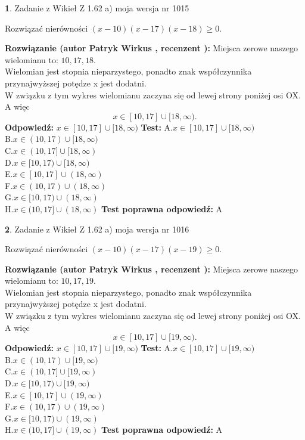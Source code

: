 \documentclass[12pt, a4paper]{article}
\theoremstyle{definition} %
\newtheorem{zad}{}
\newcommand{\zadStart}[1]{\begin{zad}#1\newline}
\newcommand{\zadStop}{\end{zad}}
\newcommand{\rozwStart}[2]{\noindent \textbf{Rozwiązanie (autor #1 , recenzent #2): }\newline}
\newcommand{\rozwStop}{\newline}
\newcommand{\odpStart}{\noindent \textbf{Odpowiedź:}\newline}
\newcommand{\odpStop}{\newline}
\newcommand{\testStart}{\noindent \textbf{Test:}\newline}
\newcommand{\testStop}{\newline}
\newcommand{\kluczStart}{\noindent \textbf{Test poprawna odpowiedź:}\newline}
\newcommand{\kluczStop}{\newline}
\begin{document}
\zadStart{Zadanie z Wikieł Z 1.62 a) moja wersja nr 1015}

Rozwiązać nierówności $(x-10)(x-17)(x-18)\ge0$.
\zadStop
\rozwStart{Patryk Wirkus}{}
Miejsca zerowe naszego wielomianu to: $10, 17, 18$.\\
Wielomian jest stopnia nieparzystego, ponadto znak współczynnika przy\linebreak najwyższej potędze x jest dodatni.\\ W związku z tym wykres wielomianu zaczyna się od lewej strony poniżej osi OX. A więc $$x \in [10,17] \cup [18,\infty).$$
\rozwStop
\odpStart
$x \in [10,17] \cup [18,\infty)$
\odpStop
\testStart
A.$x \in [10,17] \cup [18,\infty)$\\
B.$x \in (10,17) \cup [18,\infty)$\\
C.$x \in (10,17] \cup [18,\infty)$\\
D.$x \in [10,17) \cup [18,\infty)$\\
E.$x \in [10,17] \cup (18,\infty)$\\
F.$x \in (10,17) \cup (18,\infty)$\\
G.$x \in [10,17) \cup (18,\infty)$\\
H.$x \in (10,17] \cup (18,\infty)$
\testStop
\kluczStart
A
\kluczStop



\zadStart{Zadanie z Wikieł Z 1.62 a) moja wersja nr 1016}

Rozwiązać nierówności $(x-10)(x-17)(x-19)\ge0$.
\zadStop
\rozwStart{Patryk Wirkus}{}
Miejsca zerowe naszego wielomianu to: $10, 17, 19$.\\
Wielomian jest stopnia nieparzystego, ponadto znak współczynnika przy\linebreak najwyższej potędze x jest dodatni.\\ W związku z tym wykres wielomianu zaczyna się od lewej strony poniżej osi OX. A więc $$x \in [10,17] \cup [19,\infty).$$
\rozwStop
\odpStart
$x \in [10,17] \cup [19,\infty)$
\odpStop
\testStart
A.$x \in [10,17] \cup [19,\infty)$\\
B.$x \in (10,17) \cup [19,\infty)$\\
C.$x \in (10,17] \cup [19,\infty)$\\
D.$x \in [10,17) \cup [19,\infty)$\\
E.$x \in [10,17] \cup (19,\infty)$\\
F.$x \in (10,17) \cup (19,\infty)$\\
G.$x \in [10,17) \cup (19,\infty)$\\
H.$x \in (10,17] \cup (19,\infty)$
\testStop
\kluczStart
A
\kluczStop
\end{document}
